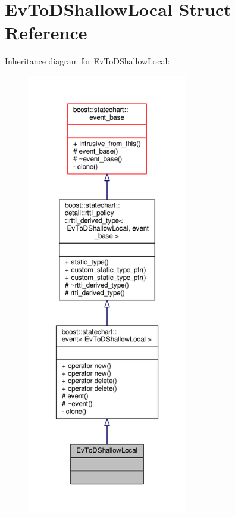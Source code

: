 \hypertarget{struct_ev_to_d_shallow_local}{}\section{Ev\+To\+D\+Shallow\+Local Struct Reference}
\label{struct_ev_to_d_shallow_local}


Inheritance diagram for Ev\+To\+D\+Shallow\+Local\+:
\nopagebreak
\begin{figure}[H]
\begin{center}
\leavevmode
\includegraphics[height=550pt]{struct_ev_to_d_shallow_local__inherit__graph}
\end{center}
\end{figure}


